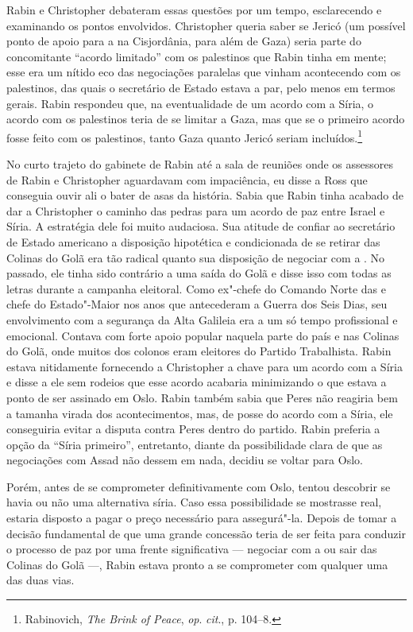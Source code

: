 Rabin e Christopher debateram essas questões por um tempo, esclarecendo
e examinando os pontos envolvidos. Christopher queria saber se Jericó
(um possível ponto de apoio para a  na Cisjordânia, para além de
Gaza) seria parte do concomitante ``acordo limitado'' com os palestinos
que Rabin tinha em mente; esse era um nítido eco das negociações
paralelas que vinham acontecendo com os palestinos, das quais o
secretário de Estado estava a par, pelo menos em termos gerais. Rabin
respondeu que, na eventualidade de um acordo com a Síria, o acordo com os
palestinos teria de se limitar a Gaza, mas que se o primeiro acordo
fosse feito com os palestinos, tanto Gaza quanto Jericó seriam
incluídos.\footnote{Rabinovich, \emph{The Brink of Peace}, \emph{op}.
\emph{cit}., p. 104--8.}

No curto trajeto do gabinete de Rabin até a sala de reuniões onde os
assessores de Rabin e Christopher aguardavam com impaciência, eu disse a
Ross que conseguia ouvir ali o bater de asas da história. Sabia que
Rabin tinha acabado de dar a Christopher o caminho das pedras para um
acordo de paz entre Israel e Síria. A estratégia dele foi muito
audaciosa. Sua atitude de confiar ao secretário de Estado americano a
disposição hipotética e condicionada de se retirar das Colinas do Golã
era tão radical quanto sua disposição de negociar com a . No passado,
ele tinha sido contrário a uma saída do Golã e disse isso com todas as
letras durante a campanha eleitoral. Como ex"-chefe do Comando Norte
das  e chefe do Estado"-Maior nos anos que antecederam a Guerra dos
Seis Dias, seu envolvimento com a segurança da Alta Galileia era a um só
tempo profissional e emocional. Contava com forte apoio popular naquela
parte do país e nas Colinas do Golã, onde muitos dos colonos eram
eleitores do Partido Trabalhista. Rabin estava nitidamente fornecendo a
Christopher a chave para um acordo com a Síria e disse a ele sem rodeios
que esse acordo acabaria minimizando o que estava a ponto de ser
assinado em Oslo. Rabin também sabia que Peres não reagiria bem a
tamanha virada dos acontecimentos, mas, de posse do acordo com a Síria,
ele conseguiria evitar a disputa contra Peres dentro do partido. Rabin
preferia a opção da ``Síria primeiro'', entretanto, diante da possibilidade
clara de que as negociações com Assad não dessem em nada, decidiu se
voltar para Oslo.

Porém, antes de se comprometer definitivamente com Oslo, tentou
descobrir se havia ou não uma alternativa síria. Caso essa possibilidade
se mostrasse real, estaria disposto a pagar o preço necessário para
assegurá"-la. Depois de tomar a decisão fundamental de que uma grande
concessão teria de ser feita para conduzir o processo de paz por uma
frente significativa --- negociar com a  ou sair das Colinas do Golã
---, Rabin estava pronto a se comprometer com qualquer uma das duas vias.

